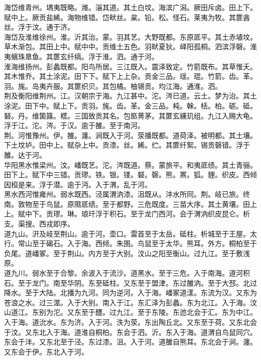 \documentclass{zhvt-classic}
\begin{document}
\hspace*{2em}海岱维青州。堣夷既略。潍。淄其道。其土白坟。海滨广潟。厥田斥卤。田上下。赋中上。厥贡盐絺。海物维错。岱畎丝。枲。铅。松。怪石。莱夷为牧。其篚酓丝。浮于汶。通于济。\\
\hspace*{2em}海岱及淮维徐州。淮。沂其治。蒙。羽其艺。大野既都。东原厎平。其土赤埴坟。草木渐包。其田上中。赋中中。贡维土五色。羽畎夏狄。峄阳孤桐。泗滨浮磬。淮夷蠙珠臮鱼。其篚玄纤缟。浮于淮。泗。通于河。\\
\hspace*{2em}淮海维扬州。彭蠡既都。阳鸟所居。三江既入。震泽致定。竹箭既布。其草惟夭。其木惟乔。其土涂泥。田下下。赋下上上杂。贡金三品。瑶。琨。竹箭。齿。革。羽。旄。岛夷卉服。其篚织贝。其包橘。柚锡贡。均江海。通淮。泗。\\
\hspace*{2em}荆及衡阳维荆州。江。汉朝宗于海。九江甚中。沱。涔已道。云土。梦为治。其土涂泥。田下中。赋上下。贡羽。旄。齿。革。金三品。杶。榦。栝。柏。砺。砥。砮。丹。维箘簬。楛。三国致贡其名。包匦菁茅。其篚玄纁玑组。九江入赐大龟。浮于江。沱。涔。于汉。逾于雒。至于南河。\\
\hspace*{2em}荆。河惟豫州。伊。雒。瀍。涧既入于河。荥播既都。道荷泽。被明都。其土壤。下土坟垆。田中上。赋杂上中。贡漆。丝。絺。纻。其篚纤絮。锡贡磬错。浮于雒。达于河。\\
\hspace*{2em}华阳黑水惟梁州。汶。嶓既艺。沱。涔既道。蔡。蒙旅平。和夷厎绩。其土青骊。田下上。赋下中三错。贡璆。铁。银。镂。砮。磬。熊。罴。狐。貍。织皮。西倾因桓是来。浮于潜。逾于沔。入于渭。乱于河。\\
\hspace*{2em}黑水西河惟雍州。弱水既西。泾属渭汭漆。沮既从。沣水所同。荆。岐已旅。终南。敦物至于鸟鼠。原隰厎绩。至于都野。三危既度。三苗大序。其土黄壤。田上上。赋中下。贡璆。琳。琅玕浮于积石。至于龙门西河。会于渭汭织皮昆仑。析支。渠搜。西戎即序。\\
\hspace*{2em}道九山。汧及岐至荆山。逾于河。壶口。雷首至于太岳。砥柱。析城至于王屋。太行。常山至于碣石。入于海。西倾。朱圉。鸟鼠至于太华。熊耳。外方。桐柏至于负尾。道嶓冢。至于荆山。内方至于大别。汶山之阳至衡山。过九江。至于敷浅原。\\
\hspace*{2em}道九川。弱水至于合黎。余波入于流沙。道黑水。至于三危。入于南海。道河积石。至于龙门。南至华阴。东至砥柱。又东至于盟津。东过雒汭。至于大邳。北过降水。至于大陆。北播为九河。同为逆河。入于海。嶓冢道漾。东流为汉。又东为苍浪之水。过三澨。入于大别。南入于江。东汇泽为彭蠡。东为北江。入于海。汶山道江。东别为沱。又东至于醴。过九江。至于东陵。东迆北会于汇。东为中江。入于海。道沇水。东为济。入于河。泆为荥。东出陶丘北。又东至于荷。又东北会于汶。又东北入于海。道淮自桐柏。东会于泗。沂。东入于海。道渭自鸟鼠同穴。东会于沣。又东北至于泾。东过漆。沮。入于河。道雒自熊耳。东北会于涧。瀍。又东会于伊。东北入于河。\\
\end{document}
